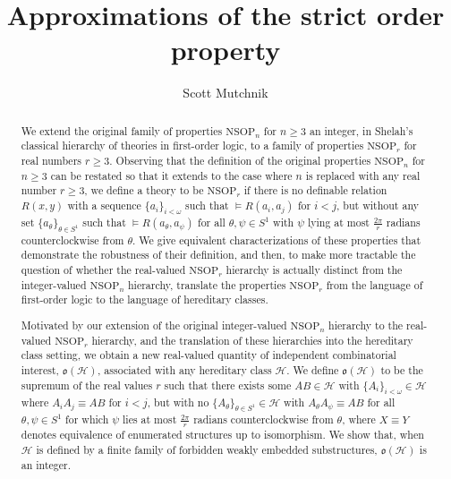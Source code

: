 \documentclass{amsart}
\title{Approximations of the strict order property}
\author{ Scott Mutchnik
}
\theoremstyle{definition}
\theoremstyle{remark}
\numberwithin{equation}{section}
\begin{document}
\begin{abstract}
We extend the original family of properties $\mathrm{NSOP}_{n}$ for $n \geq 3$ an integer, in Shelah's classical hierarchy of theories in first-order logic, to a family of properties $\mathrm{NSOP}_{r}$ for real numbers $r \geq 3$. Observing that the definition of the original properties $\mathrm{NSOP}_{n}$ for $n \geq 3$ can be restated so that it extends to the case where $n$ is replaced with any real number $r \geq 3$, we define a theory to be $\mathrm{NSOP}_{r}$ if there is no definable relation $R(x,y)$ with a sequence $\{a_{i}\}_{i < \omega}$ such that $\models R(a_{i}, a_{j})$ for $i <j$, but without any set $\{a_{\theta}\}_{\theta \in S^{1}}$ such that $\models R(a_{\theta}, a_{\psi})$ for all $\theta, \psi \in S^{1}$ with $\psi$ lying at most $\frac{2\pi}{r}$ radians counterclockwise from $\theta$. We give equivalent characterizations of these properties that demonstrate the robustness of their definition, and then, to make more tractable the question of whether the real-valued $\mathrm{NSOP}_{r}$ hierarchy is actually distinct from the integer-valued $\mathrm{NSOP}_{n}$ hierarchy, translate the properties $\mathrm{NSOP}_{r}$ from the language of first-order logic to the language of hereditary classes.

Motivated by our extension of the original integer-valued $\mathrm{NSOP}_{n}$ hierarchy to the real-valued $\mathrm{NSOP}_{r}$ hierarchy, and the translation of these hierarchies into the hereditary class setting, we obtain a new real-valued quantity of independent combinatorial interest, $\mathfrak{o}(\mathcal{H})$, associated with any hereditary class $\mathcal{H}$. We define $\mathfrak{o}(\mathcal{H})$ to be the supremum of the real values $r$ such that there exists some $AB \in \mathcal{H}$ with $\{A_{i}\}_{i< \omega} \in \mathcal{H}$ where $A_{i}A_{j} \equiv AB$ for $i < j$, but with no $\{ A_{\theta}\}_{\theta \in S^{1}} \in \mathcal{H}$ with $A_{\theta}A_{\psi} \equiv AB$ for all $\theta, \psi \in S^{1}$ for which $\psi$ lies at most $\frac{2\pi}{r}$ radians counterclockwise from $\theta$, where $X \equiv Y$ denotes equivalence of enumerated structures up to isomorphism. We show that, when $\mathcal{H}$ is defined by a finite family of forbidden weakly embedded substructures, $\mathfrak{o}(\mathcal{H})$ is an integer.


\end{abstract}
\end{document}
